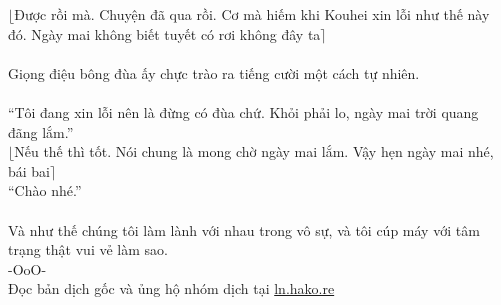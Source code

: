 \documentclass[12pt,a4paper, twosides]{book}
\begin{document}
$\lfloor$Được rồi mà. Chuyện đã qua rồi. Cơ mà hiếm khi Kouhei xin lỗi như thế này đó. Ngày mai không biết tuyết có rơi không đây ta$\rceil$\\
\\
Giọng điệu bông đùa ấy chực trào ra tiếng cười một cách tự nhiên.\\
\\
“Tôi đang xin lỗi nên là đừng có đùa chứ. Khỏi phải lo, ngày mai trời quang đãng lắm.”\\
$\lfloor$Nếu thế thì tốt. Nói chung là mong chờ ngày mai lắm. Vậy hẹn ngày mai nhé, bái bai$\rceil$\\
“Chào nhé.”\\
\\
Và như thế chúng tôi làm lành với nhau trong vô sự, và tôi cúp máy với tâm trạng thật vui vẻ làm sao.\\
-OoO-\\
Đọc bản dịch gốc và ủng hộ nhóm dịch tại \href{https://ln.hako.re/}{ln.hako.re}\\
\newpage
\end{document}
